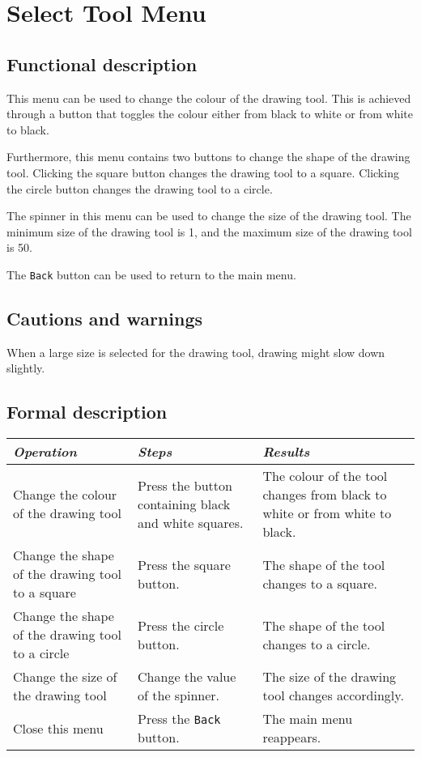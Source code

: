 \section{Select Tool Menu}\label{sec:selecttoolmenu}
  \subsection*{Functional description}
  This menu can be used to change the colour of the drawing tool. This is achieved through a button that toggles the colour either from black to white or from white to black.
  
  Furthermore, this menu contains two buttons to change the shape of the drawing tool. Clicking the square button changes the drawing tool to a square. Clicking the circle button changes the drawing tool to a circle.
  
  The spinner in this menu can be used to change the size of the drawing tool. The minimum size of the drawing tool is 1, and the maximum size of the drawing tool is 50.
  
  The \texttt{Back} button can be used to return to the main menu.

  \subsection*{Cautions and warnings}
  When a large size is selected for the drawing tool, drawing might slow down slightly.

  \subsection*{Formal description}
  \begin{tabularx}{\textwidth}{XXX}
    \toprule
    \emph{Operation} & \emph{Steps} & \emph{Results} \\
    \midrule
    Change the colour of the drawing tool & Press the button containing black and white squares. & The colour of the tool changes from black to white or from white to black. \\
    \midrule
    Change the shape of the drawing tool to a square & Press the square button. & The shape of the tool changes to a square. \\
    \midrule
    Change the shape of the drawing tool to a circle & Press the circle button. & The shape of the tool changes to a circle. \\
    \midrule
    Change the size of the drawing tool & Change the value of the spinner. & The size of the drawing tool changes accordingly. \\ 
    \midrule
    Close this menu & Press the \texttt{Back} button. & The main menu reappears.
    \bottomrule
  \end{tabularx}

